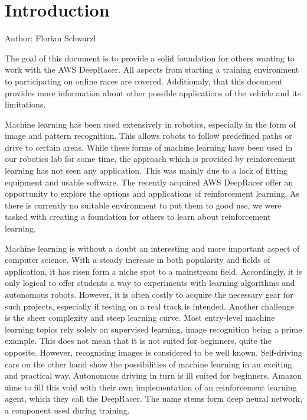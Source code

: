 \chapter{Introduction}\label{cha:Introduction}
Author: Florian Schwarzl

The goal of this document is to provide a solid foundation for others wanting to work with the AWS DeepRacer. All aspects from starting a training environment to participating on online races are covered. Additionaly, that this document provides more information about other possible applications of the vehicle and its limitations.


Machine learning has been used extensively in robotics, especially in the form of image and pattern recognition. This allows robots to follow predefined paths or drive to certain areas. While these forms of machine learning have been used in our robotics lab for some time, the approach which is provided by reinforcement learning has not seen any application. This was mainly due to a lack of fitting equipment and usable software. The recently acquired AWS DeepRacer offer an opportunity to explore the options and applications of reinforcement learning. As there is currently no suitable environment to put them to good use, we were tasked with creating a foundation for others to learn about reinforcement learning. 

Machine learning is without a doubt an interesting and more important aspect of computer science. With a steady increase in both popularity and fields of application, it has risen form a niche spot to a mainstream field. Accordingly, it is only logical to offer students a way to experiments with learning algorithms and autonomous robots. However, it is often costly to acquire the necessary gear for such projects, especially if testing on a real track is intended. Another challenge is the sheer complexity and steep learning curve. Most entry-level machine learning topics rely solely on supervised learning, image recognition being a prime example. This does not mean that it is not suited for beginners, quite the opposite. However, recognising images is considered to be well known. Self-driving cars on the other hand show the possibilities of machine learning in an exciting and practical way. Autonomous driving in turn is ill suited for beginners. Amazon aims to fill this void with their own implementation of an reinforcement learning agent, which they call the DeepRacer. The name stems form deep neural network, a component used during training.